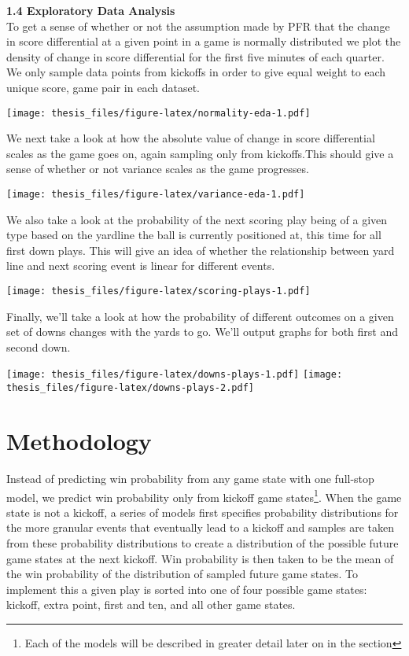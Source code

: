 \documentclass[12pt,twoside]{dukestatscithesis}
\begin{document}
\textbf{1.4 Exploratory Data Analysis}\\
To get a sense of whether or not the assumption made by PFR that the change in score differential at a given point in a game is normally distributed we plot the density of change in score differential for the first five minutes of each quarter. We only sample data points from kickoffs in order to give equal weight to each unique score, game pair in each dataset.

\texttt{[image: thesis\_files/figure-latex/normality-eda-1.pdf]}

We next take a look at how the absolute value of change in score differential scales as the game goes on, again sampling only from kickoffs.This should give a sense of whether or not variance scales as the game progresses.

\texttt{[image: thesis\_files/figure-latex/variance-eda-1.pdf]}

We also take a look at the probability of the next scoring play being of a given type based on the yardline the ball is currently positioned at, this time for all first down plays. This will give an idea of whether the relationship between yard line and next scoring event is linear for different events.

\texttt{[image: thesis\_files/figure-latex/scoring-plays-1.pdf]}

Finally, we'll take a look at how the probability of different outcomes on a given set of downs changes with the yards to go. We'll output graphs for both first and second down.

\texttt{[image: thesis\_files/figure-latex/downs-plays-1.pdf]} \texttt{[image: thesis\_files/figure-latex/downs-plays-2.pdf]}

\hypertarget{methodology}{%
\chapter{Methodology}\label{methodology}}

Instead of predicting win probability from any game state with one full-stop model, we predict win probability only from kickoff game states\footnote{Each of the models will be described in greater detail later on in the section}. When the game state is not a kickoff, a series of models first specifies probability distributions for the more granular events that eventually lead to a kickoff and samples are taken from these probability distributions to create a distribution of the possible future game states at the next kickoff. Win probability is then taken to be the mean of the win probability of the distribution of sampled future game states. To implement this a given play is sorted into one of four possible game states: kickoff, extra point, first and ten, and all other game states.
\end{document}
